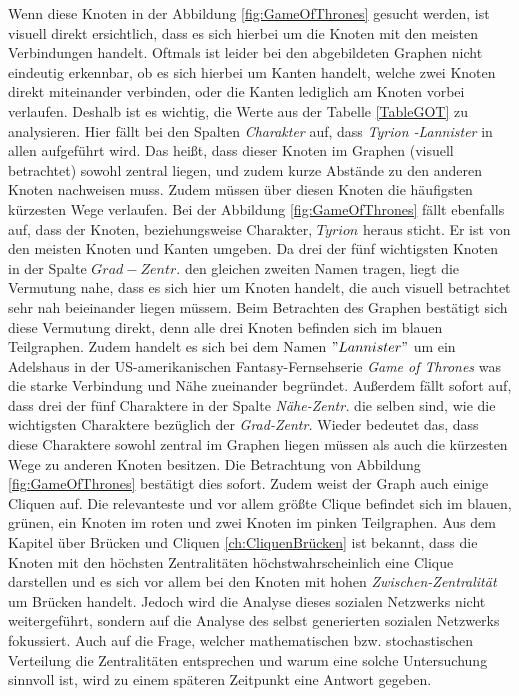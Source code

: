 Wenn diese Knoten in der Abbildung \ref{fig:GameOfThrones} gesucht werden, ist visuell direkt ersichtlich, dass es sich hierbei um die Knoten mit den meisten Verbindungen handelt. Oftmals ist leider bei den abgebildeten Graphen nicht eindeutig erkennbar, ob es sich hierbei um Kanten handelt, welche zwei Knoten direkt miteinander verbinden, oder die Kanten lediglich am Knoten vorbei verlaufen. Deshalb ist es wichtig, die Werte aus der Tabelle \ref{TableGOT} zu analysieren. Hier fällt bei den Spalten \textit{Charakter} auf, dass \textit{Tyrion -Lannister} in allen aufgeführt wird. Das heißt, dass dieser Knoten im Graphen (visuell betrachtet) sowohl zentral liegen, und zudem kurze Abstände zu den anderen Knoten nachweisen muss. Zudem müssen über diesen Knoten die häufigsten kürzesten Wege verlaufen. Bei der Abbildung \ref{fig:GameOfThrones} fällt ebenfalls auf, dass der Knoten, beziehungsweise Charakter, $Tyrion$  heraus sticht. Er ist von den meisten Knoten und Kanten umgeben. Da drei der fünf wichtigsten Knoten in der Spalte $Grad-Zentr.$ den gleichen zweiten Namen tragen, liegt die Vermutung nahe, dass es sich hier um Knoten handelt, die auch visuell betrachtet sehr nah beieinander liegen müssem. Beim Betrachten des Graphen bestätigt sich diese Vermutung direkt, denn alle drei Knoten befinden sich im blauen Teilgraphen. Zudem handelt es sich bei dem Namen $"Lannister"$ um ein Adelshaus in der US-amerikanischen Fantasy-Fernsehserie \textit{Game of Thrones} was die starke Verbindung und Nähe zueinander begründet. Außerdem fällt sofort auf, dass drei der fünf Charaktere in der Spalte \textit{Nähe-Zentr.} die selben sind, wie die wichtigsten Charaktere bezüglich der \textit{Grad-Zentr.} Wieder bedeutet das, dass diese Charaktere sowohl zentral im Graphen liegen müssen als auch die kürzesten Wege zu anderen Knoten besitzen. Die Betrachtung von Abbildung \ref{fig:GameOfThrones} bestätigt dies sofort. Zudem weist der Graph auch einige Cliquen auf. Die relevanteste und vor allem größte Clique befindet sich im blauen, grünen, ein Knoten im roten und zwei Knoten im pinken Teilgraphen. Aus dem Kapitel über Brücken und Cliquen \ref{ch:CliquenBrücken} ist bekannt, dass die Knoten mit den höchsten Zentralitäten höchstwahrscheinlich eine Clique darstellen und es sich vor allem bei den Knoten mit hohen \textit{Zwischen-Zentralität} um Brücken handelt. Jedoch wird die Analyse dieses sozialen Netzwerks nicht weitergeführt, sondern auf die Analyse des selbst generierten sozialen Netzwerks fokussiert. Auch auf die Frage, welcher mathematischen bzw. stochastischen Verteilung die Zentralitäten entsprechen und warum eine solche Untersuchung sinnvoll ist, wird zu einem späteren Zeitpunkt eine Antwort gegeben.

